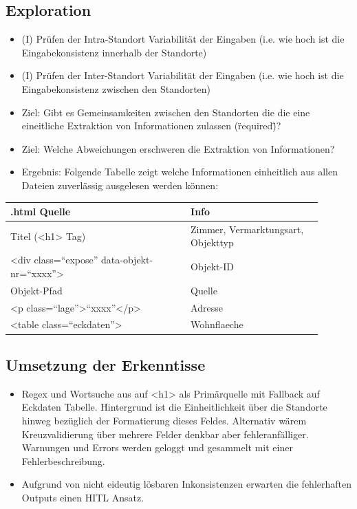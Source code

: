 \documentclass[11pt]{article}
\begin{document}
\subsection{Exploration}
\begin{itemize}
    \item (I) Prüfen der Intra-Standort Variabilität der Eingaben (i.e. wie hoch ist die Eingabekonsistenz innerhalb der Standorte)
    \item (I) Prüfen der Inter-Standort Variabilität der Eingaben (i.e. wie hoch ist die Eingabekonsistenz zwischen den Standorten)
    \item Ziel: Gibt es Gemeinsamkeiten zwischen den Standorten die die eine eineitliche Extraktion von Informationen zulassen (\"required\")?
    \item Ziel: Welche Abweichungen erschweren die Extraktion von Informationen?
    \item Ergebnis: Folgende Tabelle zeigt welche Informationen einheitlich aus allen Dateien zuverlässig ausgelesen werden können:
\end{itemize}
\begin{table}[h]
    \centering
    \begin{tabular}{@{} p{0.52\linewidth} p{0.38\linewidth} @{}}
        \toprule
        \textbf{.html Quelle} & \textbf{Info} \\
        \midrule
        Titel (<h1> Tag) & Zimmer, Vermarktungsart, Objekttyp \\
        <div class=\enquote{expose} data-objekt-nr=\enquote{xxxx}> & Objekt-ID \\
        Objekt-Pfad & Quelle \\
        <p class=\enquote{lage}>\enquote{xxxx}</p> & Adresse\\
        <table class=\enquote{eckdaten}> & Wohnflaeche\\
        \bottomrule
    \end{tabular}
\end{table}
\subsection{Umsetzung der Erkenntisse}
\begin{itemize}
    \item Regex und Wortsuche aus auf <h1> als Primärquelle mit Fallback auf Eckdaten Tabelle. Hintergrund ist die Einheitlichkeit über die Standorte hinweg bezüglich der Formatierung dieses Feldes. Alternativ wärem Kreuzvalidierung über mehrere Felder denkbar aber fehleranfälliger.
     Warnungen und Errors werden geloggt und gesammelt mit einer Fehlerbeschreibung.
    \item Aufgrund von nicht eideutig lösbaren Inkonsistenzen erwarten die fehlerhaften Outputs einen HITL Ansatz.
\end{itemize}
\end{document}
